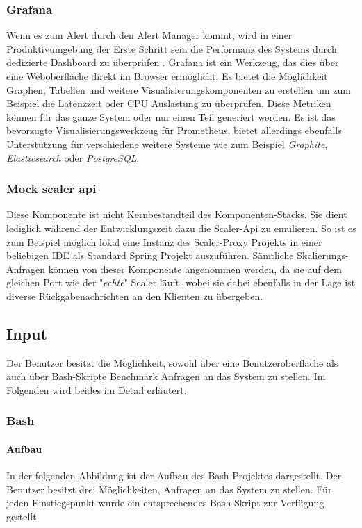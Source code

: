 \subsubsection{Grafana \checkmark}
Wenn es zum Alert durch den Alert Manager kommt, wird in einer Produktivumgebung der Erste Schritt sein die Performanz des Systems durch dedizierte Dashboard zu überprüfen \cite[Seite~97]{oreillyPrometheus}. Grafana ist ein Werkzeug, das dies über eine Weboberfläche direkt im Browser ermöglicht. Es bietet die Möglichkeit Graphen, Tabellen und weitere Visualisierungskomponenten zu erstellen um zum Beispiel die Latenzzeit oder CPU Auslastung zu überprüfen. Diese Metriken können für das ganze System oder nur einen Teil generiert werden. Es ist das bevorzugte Visualisierungswerkzeug für Prometheus, bietet allerdings ebenfalls Unterstützung für verschiedene weitere Systeme wie zum Beispiel \emph{Graphite}, \emph{Elasticsearch} oder \emph{PostgreSQL}.


\subsubsection{Mock scaler api \checkmark}
Diese Komponente ist nicht Kernbestandteil des Komponenten-Stacks. Sie dient lediglich während der Entwicklungszeit dazu die Scaler-Api zu emulieren. So ist es zum Beispiel möglich lokal eine Instanz des Scaler-Proxy Projekts in einer beliebigen IDE als Standard Spring Projekt auszuführen. Sämtliche Skalierungs-Anfragen können von dieser Komponente angenommen werden, da sie auf dem gleichen Port wie der "\emph{echte}" Scaler läuft, wobei sie dabei ebenfalls in der Lage ist diverse Rückgabenachrichten an den Klienten zu übergeben.




\subsection{Input \checkmark}

Der Benutzer besitzt die Möglichkeit, sowohl über eine Benutzeroberfläche als auch über Bash-Skripte Benchmark Anfragen an das System zu stellen. Im Folgenden wird beides im Detail erläutert.

\subsubsection{Bash \checkmark}
\paragraph{Aufbau}
In der folgenden Abbildung ist der Aufbau des Bash-Projektes dargestellt. Der Benutzer besitzt drei Möglichkeiten, Anfragen an das System zu stellen. Für jeden Einstiegspunkt wurde ein entsprechendes Bash-Skript zur Verfügung gestellt.


